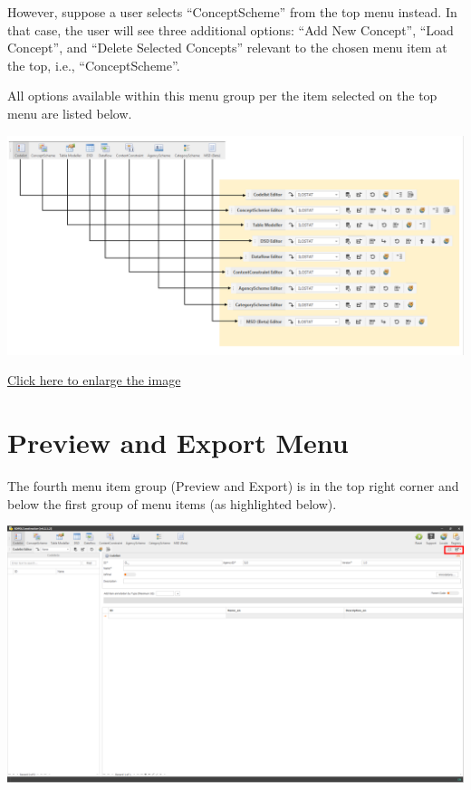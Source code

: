 \documentclass[
]{book}
\begin{document}
However, suppose a user selects ``ConceptScheme'' from the top menu instead. In that case, the user will see three additional options: ``Add New Concept'', ``Load Concept'', and ``Delete Selected Concepts'' relevant to the chosen menu item at the top, i.e., ``ConceptScheme''.

All options available within this menu group per the item selected on the top menu are listed below.

\begin{center}\includegraphics[width=1\linewidth]{./images/image032} \end{center}

\href{images/image032.png}{Click here to enlarge the image}

\hypertarget{preview-and-export-menu}{%
\section{Preview and Export Menu}\label{preview-and-export-menu}}

The fourth menu item group (Preview and Export) is in the top right corner and below the first group of menu items (as highlighted below).

\begin{center}\includegraphics[width=1\linewidth]{./images/image034} \end{center}
\end{document}
